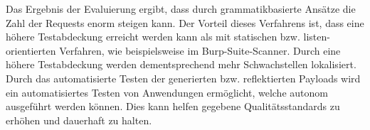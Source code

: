 Das Ergebnis der Evaluierung ergibt, dass durch grammatikbasierte Ansätze die Zahl der Requests enorm steigen kann. Der Vorteil dieses Verfahrens ist, dass eine höhere Testabdeckung erreicht werden kann als mit statischen bzw. listen-orientierten Verfahren, wie beispielsweise im Burp-Suite-Scanner. Durch eine höhere Testabdeckung werden dementsprechend mehr Schwachstellen lokalisiert. Durch das automatisierte Testen der generierten bzw. reflektierten Payloads wird ein automatisiertes Testen von Anwendungen ermöglicht, welche autonom ausgeführt werden können. Dies kann helfen gegebene Qualitätsstandards zu erhöhen und dauerhaft zu halten.